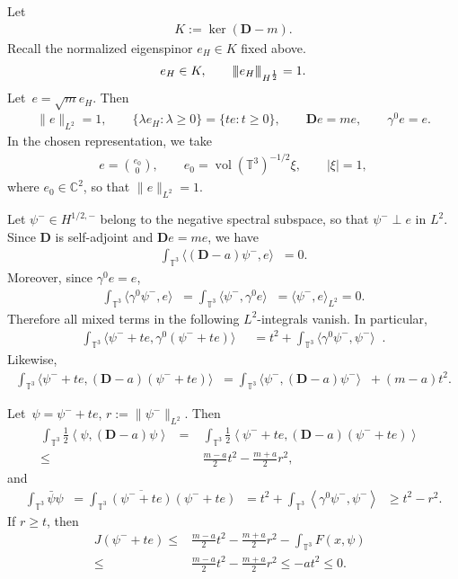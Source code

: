 \documentclass[11pt,final]{amsart}
\newcommand{\tnorm}[1]{%
  \left\vert\kern-0.3ex\left\vert\kern-0.3ex\left\vert #1 \right\vert\kern-0.3ex\right\vert\kern-0.3ex\right\vert
}
\newcommand{\Abracket}[1]{\left<#1\right>} %
\newcommand{\T}{\mathbb{T}}
\newcommand{\dd}{\mathop{}\!\mathrm{d}}
\newcommand{\pD}{\mathbf{D}}
\DeclareMathOperator{\dv}{\dd{vol}}
\begin{document}
Let
\begin{align}
K:=\ker(\pD-m).
\end{align}
Recall the normalized eigenspinor $e_H\in K$ fixed above.
\begin{align}
    e_H\in K,\qquad \tnorm{e_H}_{H^{\frac{1}{2}}}=1.
\end{align}
Let~$e=\sqrt{m}e_H$. Then
\begin{align}
\|e\|_{L^2}=1,\qquad
\{\lambda e_H:\lambda\ge0\}
=
\{t e:t\ge0\},
\qquad
\pD e=me,
\qquad
\gamma^0e=e.
\end{align}
In the chosen representation, we take
\begin{align}
e=\binom{e_0}{0},\qquad e_0={\operatorname{vol}(\mathbb T^3)}^{-1/2}\xi,\qquad |\xi|=1,
\end{align}
where $e_0\in\mathbb C^2$, so that $\|e\|_{L^2}=1$.

Let $\psi^-\in H^{1/2,-}$ belong to the negative spectral subspace, so that
$\psi^-\perp e$ in $L^2$. Since $\pD$ is self-adjoint and $\pD e=me$, we have
\begin{align}
\int_{\T^3}
\langle (\pD-a)\psi^-,e\rangle\dv=0.
\end{align}
Moreover, since $\gamma^0e=e$,
\begin{align}
\int_{\T^3}
\langle \gamma^0\psi^-,e\rangle\dv
=
\int_{\T^3}
\langle \psi^-,\gamma^0e\rangle\dv
=
\langle\psi^-,e\rangle_{L^2}
=0.
\end{align}
Therefore all mixed terms in the following $L^2$-integrals vanish. In particular,
\begin{align}
\int_{\T^3}
\langle \psi^-+te,\gamma^0(\psi^-+te)\rangle\dv
&=
t^2+
\int_{\T^3}
\langle\gamma^0\psi^-,\psi^-\rangle\dv.
\end{align}
Likewise,
\begin{align}
\int_{\T^3}
\langle \psi^-+te,(\pD-a)(\psi^-+te)\rangle\dv
=
\int_{\T^3}
\langle\psi^-,(\pD-a)\psi^-\rangle\dv
+(m-a)t^2.
\end{align}

Let~$\psi=\psi^-+te$, $r:=\|\psi^-\|_{L^2}$. Then
    \begin{align}
        \int_{\T^3}\frac{1}{2}\Abracket{\psi, (\pD-a)\psi}\dv
        =&\int_{\T^3} \frac{1}{2}\Abracket{\psi^- + te, (\pD-a)(\psi^-+ te)}\dv \\
        \leq & \frac{m-a}{2}t^2-\frac{m+a}{2}r^2,
    \end{align}
    and
    \begin{align}
        \int_{\T^3}\bar{\psi}\psi\dv
        =\int_{\T^3}\overline{(\psi^- +te)}(\psi^- +te)\dv
        =t^2+\int_{\T^3} \Abracket{\gamma^0\psi^-,\psi^-}\dv
        \geq t^2-r^2.
    \end{align}
    If $r\geq t$, then
    \begin{align}
    J(\psi^-+ te)
    \leq&\frac{m-a}{2} t^2 -\frac{m+a}{2} r^2 - \int_{\T^3} F(x,\psi)\dv \\
    \leq & \frac{m-a}{2} t^2 -\frac{m+a}{2} r^2 \leq -a t^2\leq 0.
    \end{align}
\end{document}
